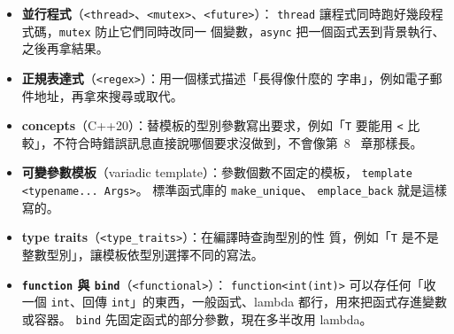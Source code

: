 \begin{itemize}
\item \textbf{並行程式}（\texttt{<thread>}、\texttt{<mutex>}、\texttt{<future>}）：
\texttt{thread} 讓程式同時跑好幾段程式碼，\texttt{mutex} 防止它們同時改同一
個變數，\texttt{async} 把一個函式丟到背景執行、之後再拿結果。
\item \textbf{正規表達式}（\texttt{<regex>}）：用一個樣式描述「長得像什麼的
字串」，例如電子郵件地址，再拿來搜尋或取代。
\item \textbf{concepts}（C++20）：替模板的型別參數寫出要求，例如「\texttt{T}
要能用 \texttt{<} 比較」，不符合時錯誤訊息直接說哪個要求沒做到，不會像第~8~
章那樣長。
\item \textbf{可變參數模板}（variadic template）：參數個數不固定的模板，
\texttt{template <typename... Args>}。 標準函式庫的 \texttt{make\_unique}、
\texttt{emplace\_back} 就是這樣寫的。
\item \textbf{type traits}（\texttt{<type\_traits>}）：在編譯時查詢型別的性
質，例如「\texttt{T} 是不是整數型別」，讓模板依型別選擇不同的寫法。
\item \textbf{\texttt{function} 與 \texttt{bind}}（\texttt{<functional>}）：
\texttt{function<int(int)>} 可以存任何「收一個 \texttt{int}、回傳
\texttt{int}」的東西，一般函式、lambda 都行，用來把函式存進變數或容器。
\texttt{bind} 先固定函式的部分參數，現在多半改用 lambda。
\end{itemize}
